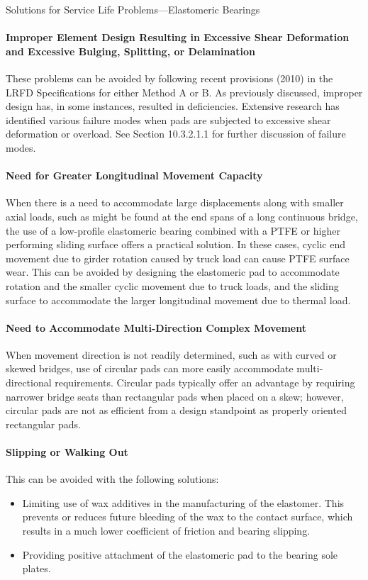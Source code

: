 \begin{table}
  \caption{Solutions for Service Life Problems—Elastomeric Bearings}
  \label{tab:solutions-elastomeric-bearing}
\end{table}

\paragraph{Improper Element Design Resulting in Excessive Shear Deformation and Excessive Bulging, Splitting, or Delamination}
These problems can be avoided by following recent provisions (2010) in the LRFD Specifications for either
Method A or B. As previously discussed, improper design has, in some instances, resulted in deficiencies. Extensive
research has identified various failure modes when pads are subjected to excessive shear deformation or overload.
See Section 10.3.2.1.1 for further discussion of failure modes.

\paragraph{Need for Greater Longitudinal Movement Capacity}
When there is a need to accommodate large displacements along with smaller axial loads, such as might be found
at the end spans of a long continuous bridge, the use of a low-profile elastomeric bearing combined with a PTFE or higher performing sliding surface offers a practical solution. In these cases, cyclic end movement due to girder
rotation caused by truck load can cause PTFE surface wear. This can be avoided by designing the elastomeric pad to
accommodate rotation and the smaller cyclic movement due to truck loads, and the sliding surface to accommodate
the larger longitudinal movement due to thermal load.


\paragraph{Need to Accommodate Multi-Direction Complex Movement}
When movement direction is not readily determined, such as with curved or skewed bridges, use of circular pads
can more easily accommodate multi-directional requirements. Circular pads typically offer an advantage by requiring
narrower bridge seats than rectangular pads when placed on a skew; however, circular pads are not as efficient from a
design standpoint as properly oriented rectangular pads.

\paragraph{Slipping or Walking Out}
This can be avoided with the following solutions:
\begin{itemize}
  \item Limiting use of wax additives in the manufacturing of the elastomer. This prevents or reduces future bleeding of the wax to the contact surface, which results in a much lower coefficient of friction and bearing slipping.
  \item Providing positive attachment of the elastomeric pad to the bearing sole plates.
\end{itemize}

